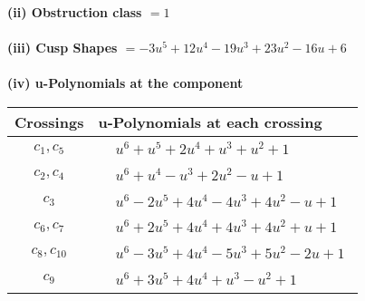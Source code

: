 \documentclass[1p]{elsarticle_modified}
\theoremstyle{definition}
\begin{document}
\flushleft \textbf{(ii) Obstruction class $= 1$}\\~\\
\flushleft \textbf{(iii) Cusp Shapes $= -3 u^5+12 u^4-19 u^3+23 u^2-16 u+6$}\\~\\
\newpage\renewcommand{\arraystretch}{1}
\flushleft \textbf{(iv) u-Polynomials at the component}\newline \\
\begin{tabular}{m{50pt}|m{274pt}}
Crossings & \hspace{64pt}u-Polynomials at each crossing \\
\hline $$\begin{aligned}c_{1},c_{5}\end{aligned}$$&$\begin{aligned}
&u^6+u^5+2 u^4+u^3+u^2+1
\end{aligned}$\\
\hline $$\begin{aligned}c_{2},c_{4}\end{aligned}$$&$\begin{aligned}
&u^6+u^4- u^3+2 u^2- u+1
\end{aligned}$\\
\hline $$\begin{aligned}c_{3}\end{aligned}$$&$\begin{aligned}
&u^6-2 u^5+4 u^4-4 u^3+4 u^2- u+1
\end{aligned}$\\
\hline $$\begin{aligned}c_{6},c_{7}\end{aligned}$$&$\begin{aligned}
&u^6+2 u^5+4 u^4+4 u^3+4 u^2+u+1
\end{aligned}$\\
\hline $$\begin{aligned}c_{8},c_{10}\end{aligned}$$&$\begin{aligned}
&u^6-3 u^5+4 u^4-5 u^3+5 u^2-2 u+1
\end{aligned}$\\
\hline $$\begin{aligned}c_{9}\end{aligned}$$&$\begin{aligned}
&u^6+3 u^5+4 u^4+u^3- u^2+1
\end{aligned}$\\
\hline
\end{tabular}\\~\\
\end{document}
